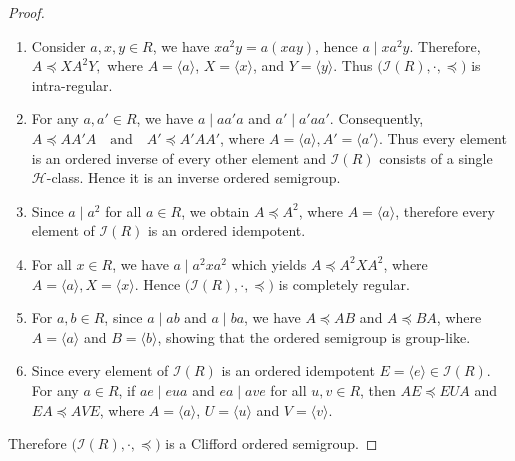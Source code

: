 \documentclass[12pt,a4paper]{amsart}
\theoremstyle{plain}
\theoremstyle{definition}
\begin{document}
\begin{proof}
	\begin{enumerate}
		\item Consider $a, x, y \in R$, we have $xa^{2}y = a(xay)$, hence $a \mid xa^{2}y$. Therefore, $A \preccurlyeq XA^{2}Y,$
	where $A = \langle a \rangle$, $X = \langle x \rangle$, and $Y = \langle y \rangle$.
	Thus $\big(\mathcal{I}(R), \cdot , \preccurlyeq\big)$ is intra-regular.

	\item For any $a,a' \in R$, we have $a \mid a a' a$ and $a' \mid a' a a'$.
	Consequently, $A \preccurlyeq A A'A
	\quad \text{and} \quad
	A'\preccurlyeq
	A'AA'$, where $A = \langle a \rangle, A' = \langle a' \rangle$. Thus every element is an ordered inverse of every other element and
	$\mathcal{I}(R)$ consists of a single $\mathcal{H}$-class.
	Hence it is an inverse ordered semigroup.
	
	\item Since $a \mid a^{2}$ for all $a \in R$, we obtain $A \preccurlyeq  A^{2}$, where $A = \langle a \rangle$, therefore every element of $\mathcal{I}(R)$ is an ordered idempotent.
	
	\item For all $x \in R$, we have $a \mid a^{2} x a^{2}$ which yields $A \preccurlyeq A^{2}X A^{2}$, where $A = \langle a \rangle, X = \langle x \rangle $.
	Hence $\big(\mathcal{I}(R), \cdot , \preccurlyeq\big)$ is completely regular.
	
	\item For $a,b \in R$, since $a \mid ab$ and $a \mid ba$, we have $A \preccurlyeq AB$ and $A \preccurlyeq BA$, where $A = \langle a \rangle $ and $B = \langle b \rangle$,
	showing that the ordered semigroup is group-like.
	
	\item Since every element of $\mathcal{I}(R)$ is an ordered idempotent
	$ E = \langle e \rangle \in \mathcal{I}(R)$.
	For any $a \in R$, if $ae \mid eua$ and $ea \mid ave$ for all $u,v \in R$, then $AE \preccurlyeq EUA $ and $EA \preccurlyeq AVE $, where $A = \langle a \rangle$, $ U = \langle u \rangle$ and $V = \langle v \rangle$.
\end{enumerate}
	Therefore
	$\big(\mathcal{I}(R), \cdot , \preccurlyeq\big)$ is a Clifford ordered semigroup.
\end{proof}
\end{document}
